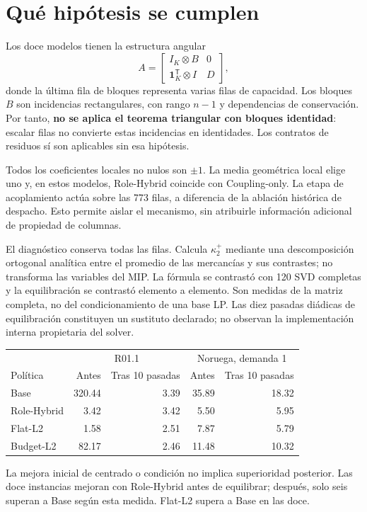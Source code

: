 \documentclass[10pt,a4paper]{article}
\begin{document}
\section{Qué hipótesis se cumplen}
Los doce modelos tienen la estructura angular
\[
 A=\begin{bmatrix}I_K\otimes B&0\\
 \mathbf{1}_K^{\mathsf T}\otimes I&D\end{bmatrix},
\]
donde la última fila de bloques representa varias filas de capacidad.
Los bloques $B$ son incidencias rectangulares, con rango $n-1$ y dependencias
de conservación. Por tanto, \textbf{no se aplica el teorema triangular con bloques
identidad}: escalar filas no convierte estas incidencias en identidades.
Los contratos de residuos sí son aplicables sin esa hipótesis.

Todos los coeficientes locales no nulos son $\pm1$. La media geométrica local
elige uno y, en estos modelos, Role-Hybrid coincide con Coupling-only.
La etapa de acoplamiento actúa sobre las 773 filas, a diferencia de la ablación
histórica de despacho. Esto permite aislar el mecanismo, sin atribuirle
información adicional de propiedad de columnas.

El diagnóstico conserva todas las filas. Calcula $\kappa_2^+$ mediante una
descomposición ortogonal analítica entre el promedio de las mercancías y sus
contrastes; no transforma las variables del MIP. La fórmula se contrastó con
120 SVD completas y la equilibración se contrastó elemento a elemento.
Son medidas de la matriz completa, no del condicionamiento de una base LP.
Las diez pasadas diádicas de equilibración constituyen un sustituto declarado;
no observan la implementación interna propietaria del solver.

\begin{center}\small
\begin{tabular}{lrrrr}
\toprule
&\multicolumn{2}{c}{R01.1}&\multicolumn{2}{c}{Noruega, demanda 1}\\
Política&Antes&Tras 10 pasadas&Antes&Tras 10 pasadas\\\midrule
Base&320.44&3.39&35.89&18.32\\
Role-Hybrid&3.42&3.42&5.50&5.95\\
Flat-L2&1.58&2.51&7.87&5.79\\
Budget-L2&82.17&2.46&11.48&10.32\\\bottomrule
\end{tabular}
\end{center}
La mejora inicial de centrado o condición no implica superioridad posterior.
Las doce instancias mejoran con Role-Hybrid antes de equilibrar; después,
solo seis superan a Base según esta medida. Flat-L2 supera a Base en las doce.
\end{document}
